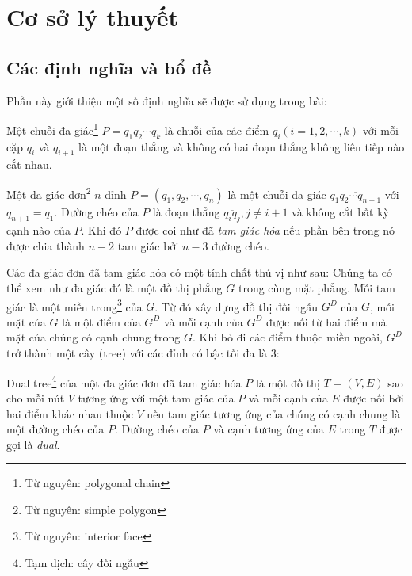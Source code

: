 \section{Cơ sở lý thuyết}
\subsection{Các định nghĩa và bổ đề}%
Phần này giới thiệu một số định nghĩa sẽ được sử dụng trong bài:

\begin{definition}
    Một chuỗi đa giác\footnote{Từ nguyên: polygonal chain} $P = \overline{q_1 q_2 \cdots q_k}$ là chuỗi của các điểm $q_i (i=1, 2, \cdots, k)$ với mỗi cặp $q_i$ và $q_{i+1}$ là một đoạn thẳng và không có hai đoạn thẳng không liên tiếp nào cắt nhau.
\end{definition}

\begin{definition}
    Một đa giác đơn\footnote{Từ nguyên: simple polygon} $n$ đỉnh $P=\left(q_1, q_2, \cdots,q_n\right)$ là một chuỗi đa giác $\overline{q_1 q_2 \cdots q_{n+1}}$ với $q_{n+1} = q_1$. Đường chéo của $P$ là đoạn thẳng $\overline{q_i q_j}, j\ne i + 1$ và không cắt bất kỳ cạnh nào của $P$. Khi đó $P$ được coi như đã \textit{tam giác hóa} nếu phần bên trong nó được chia thành $n-2$ tam giác bởi $n-3$ đường chéo.
\end{definition}

Các đa giác đơn đã tam giác hóa có một tính chất thú vị như sau: Chúng ta có thể xem như đa giác đó là một đồ thị phẳng $G$ trong cùng mặt phẳng. Mỗi tam giác là một miền trong\footnote{Từ nguyên: interior face} của $G$. Từ đó xây dựng đồ thị đối ngẫu $G^D$ của $G$, mỗi mặt của $G$ là một điểm của $G^D$ và mỗi cạnh của $G^D$ được nối từ hai điểm mà mặt của chúng có cạnh chung trong $G$. Khi bỏ đi các điểm thuộc miền ngoài, $G^D$ trở thành một cây (tree) với các đỉnh có bậc tối đa là 3:

\begin{definition}
    Dual tree\footnote{Tạm dịch: cây đối ngẫu} của một đa giác đơn đã tam giác hóa $P$ là một đồ thị $T=(V,E)$ sao cho mỗi nút $V$ tương ứng với một tam giác của $P$ và mỗi cạnh của $E$ được nối bởi hai điểm khác nhau thuộc $V$ nếu tam giác tương ứng của chúng có cạnh chung là một đường chéo của $P$. Đường chéo của $P$ và cạnh tương ứng của $E$ trong $T$ được gọi là \textit{dual}.
\end{definition}


